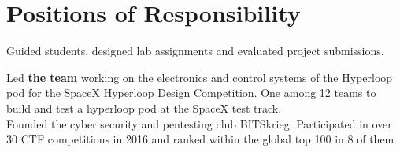 \documentclass[]{illustris-resume-openfont}
\newcommand{\myul}[2][black]{\setulcolor{#1}\ul{#2}\setulcolor{black}}
\begin{document}
\begin{minipage}[t]{0.66\textwidth}



\section{Positions of Responsibility}

Guided students, designed lab assignments and evaluated project submissions.
\sectionsep

Led \textbf{\href{https://www.facebook.com/teamhyperloopindia}{\color{blue} \myul[blue] {the team}}} working on the electronics and control systems of the Hyperloop pod for the SpaceX Hyperloop Design Competition. One among 12 teams to build and test a hyperloop pod at the SpaceX test track.\\
\sectionsep
{}
Founded the cyber security and pentesting club BITSkrieg. Participated in over 30 CTF competitions in 2016 and ranked within the global top 100 in 8 of them


\end{minipage}
\end{document}
